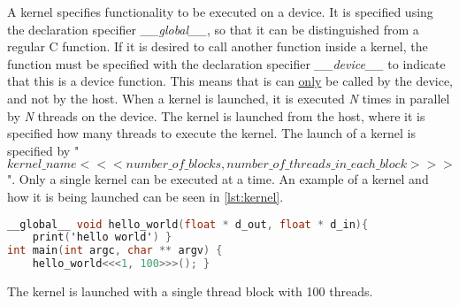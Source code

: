 A kernel specifies functionality to be executed on a device.
It is specified using the declaration specifier \textit{\_\_global\_\_}, so that it can be distinguished from a regular C function.
If it is desired to call another function inside a kernel, the function must be specified with the declaration specifier \textit{\_\_device\_\_} to indicate that this is a device function.
This means that is can \underline{only} be called by the device, and not by the host.
When a kernel is launched, it is executed \textit{N} times in parallel by \textit{N} threads on the device.
The kernel is launched from the host, where it is specified how many \cuda{} threads to execute the kernel.
The launch of a kernel is specified by "$kernel\_name<<< number\_of\_blocks, number\_of\_threads\_in\_each\_block >>>$".
Only a single kernel can be executed at a time.
An example of a kernel and how it is being launched can be seen in \autoref{lst:kernel}.
\begin{lstlisting}[language=C,caption={Kernel example},label=lst:kernel]
__global__ void hello_world(float * d_out, float * d_in){
	print('hello world') }
int main(int argc, char ** argv) {
	hello_world<<<1, 100>>>(); }
\end{lstlisting}
The kernel is launched with a single thread block with 100 threads.